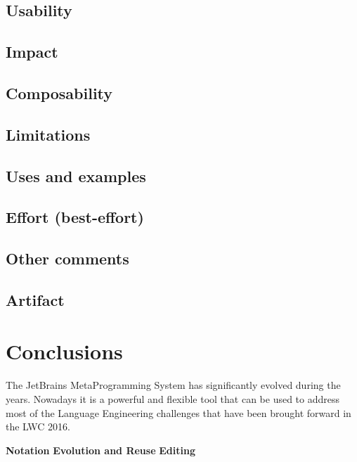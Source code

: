 \documentclass[preprint,numbers,10pt]{sigplanconf}
\begin{document}
\subsection{Usability}

\subsection{Impact}

\subsection{Composability}

\subsection{Limitations}

\subsection{Uses and examples}

\subsection{Effort (best-effort)}

\subsection{Other comments}

\subsection{Artifact}

%
%

\section{Conclusions}

The JetBrains MetaProgramming System has significantly evolved during the years. Nowadays it is a powerful and flexible tool that can be used to address most of the Language Engineering challenges that have been brought forward in the LWC 2016.

\textbf{Notation}
\textbf{Evolution and Reuse}
\textbf{Editing}



\end{document}
